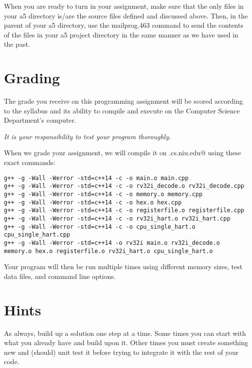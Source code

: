 \documentclass{article}
\begin{document}
When you are ready to turn in your assignment, make sure that the only files in your a5 directory
is/are the source files defined and discussed above. Then, in the parent of your a5 directory, use
the mailprog.463 command to send the contents of the files in your a5 project directory in the
same manner as we have used in the past.

\section{Grading}

The grade you receive on this programming assignment will be scored according to the
syllabus and its ability to compile and execute on the Computer Science Department's 
computer.

{\em It is your responsibility to test your program thoroughly.} 

When we grade your assignment, we will compile it on \verb@hopper.cs.niu.edu@ 
using these exact commands:

{\footnotesize
\begin{verbatim}
g++ -g -Wall -Werror -std=c++14 -c -o main.o main.cpp
g++ -g -Wall -Werror -std=c++14 -c -o rv32i_decode.o rv32i_decode.cpp
g++ -g -Wall -Werror -std=c++14 -c -o memory.o memory.cpp
g++ -g -Wall -Werror -std=c++14 -c -o hex.o hex.cpp
g++ -g -Wall -Werror -std=c++14 -c -o registerfile.o registerfile.cpp
g++ -g -Wall -Werror -std=c++14 -c -o rv32i_hart.o rv32i_hart.cpp
g++ -g -Wall -Werror -std=c++14 -c -o cpu_single_hart.o cpu_single_hart.cpp
g++ -g -Wall -Werror -std=c++14 -o rv32i main.o rv32i_decode.o memory.o hex.o registerfile.o rv32i_hart.o cpu_single_hart.o  
\end{verbatim}
}

Your program will then be run multiple times using different memory sizes, 
test data files, and command line options.


\section{Hints}

As always, build up a solution one step at a time.  Some times you
can start with what you already have and build upon it.  Other times 
you must create something new and (should) unit test it before trying to 
integrate it with the rest of your code.
\end{document}
